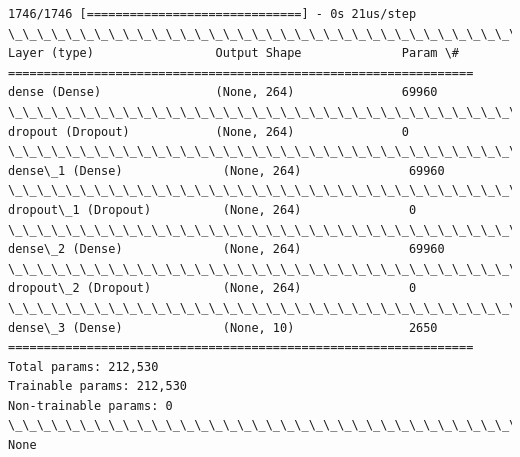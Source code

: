 \documentclass[11pt]{article}
\begin{document}
    \begin{Verbatim}[commandchars=\\\{\}]
1746/1746 [==============================] - 0s 21us/step
\_\_\_\_\_\_\_\_\_\_\_\_\_\_\_\_\_\_\_\_\_\_\_\_\_\_\_\_\_\_\_\_\_\_\_\_\_\_\_\_\_\_\_\_\_\_\_\_\_\_\_\_\_\_\_\_\_\_\_\_\_\_\_\_\_
Layer (type)                 Output Shape              Param \#   
=================================================================
dense (Dense)                (None, 264)               69960     
\_\_\_\_\_\_\_\_\_\_\_\_\_\_\_\_\_\_\_\_\_\_\_\_\_\_\_\_\_\_\_\_\_\_\_\_\_\_\_\_\_\_\_\_\_\_\_\_\_\_\_\_\_\_\_\_\_\_\_\_\_\_\_\_\_
dropout (Dropout)            (None, 264)               0         
\_\_\_\_\_\_\_\_\_\_\_\_\_\_\_\_\_\_\_\_\_\_\_\_\_\_\_\_\_\_\_\_\_\_\_\_\_\_\_\_\_\_\_\_\_\_\_\_\_\_\_\_\_\_\_\_\_\_\_\_\_\_\_\_\_
dense\_1 (Dense)              (None, 264)               69960     
\_\_\_\_\_\_\_\_\_\_\_\_\_\_\_\_\_\_\_\_\_\_\_\_\_\_\_\_\_\_\_\_\_\_\_\_\_\_\_\_\_\_\_\_\_\_\_\_\_\_\_\_\_\_\_\_\_\_\_\_\_\_\_\_\_
dropout\_1 (Dropout)          (None, 264)               0         
\_\_\_\_\_\_\_\_\_\_\_\_\_\_\_\_\_\_\_\_\_\_\_\_\_\_\_\_\_\_\_\_\_\_\_\_\_\_\_\_\_\_\_\_\_\_\_\_\_\_\_\_\_\_\_\_\_\_\_\_\_\_\_\_\_
dense\_2 (Dense)              (None, 264)               69960     
\_\_\_\_\_\_\_\_\_\_\_\_\_\_\_\_\_\_\_\_\_\_\_\_\_\_\_\_\_\_\_\_\_\_\_\_\_\_\_\_\_\_\_\_\_\_\_\_\_\_\_\_\_\_\_\_\_\_\_\_\_\_\_\_\_
dropout\_2 (Dropout)          (None, 264)               0         
\_\_\_\_\_\_\_\_\_\_\_\_\_\_\_\_\_\_\_\_\_\_\_\_\_\_\_\_\_\_\_\_\_\_\_\_\_\_\_\_\_\_\_\_\_\_\_\_\_\_\_\_\_\_\_\_\_\_\_\_\_\_\_\_\_
dense\_3 (Dense)              (None, 10)                2650      
=================================================================
Total params: 212,530
Trainable params: 212,530
Non-trainable params: 0
\_\_\_\_\_\_\_\_\_\_\_\_\_\_\_\_\_\_\_\_\_\_\_\_\_\_\_\_\_\_\_\_\_\_\_\_\_\_\_\_\_\_\_\_\_\_\_\_\_\_\_\_\_\_\_\_\_\_\_\_\_\_\_\_\_
None

    \end{Verbatim}

    \begin{center}
    \end{center}
    { \hspace*{\fill} \\}
    
    \begin{center}
    \end{center}
    { \hspace*{\fill} \\}
    
\end{document}
